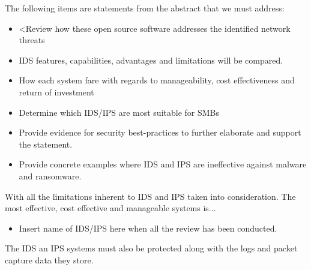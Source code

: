 \begin{followup}
    The following items are statements from the abstract that we must address:
    
    \begin{itemize}
        \item <Review how these open source software addresses the identified network threats
        \item IDS features, capabilities, advantages and limitations will be compared.
        \item How each system fare with regards to manageability, cost effectiveness and return of investment
        \item Determine which IDS/IPS are most suitable for SMBs
    \end{itemize}
    
\end{followup}


\begin{followup}[to-do]
    \begin{itemize}
        \item Provide evidence for security best-practices to further elaborate and support the statement.
        \item Provide concrete examples where IDS and IPS are ineffective against malware and ransomware.
    \end{itemize}
\end{followup}

With all the limitations inherent to IDS and IPS taken into consideration. The most effective, cost effective and manageable systems is...

\begin{followup}[to-do]
    \begin{itemize}
        \item Insert name of IDS/IPS here when all the review has been conducted.
    \end{itemize}
\end{followup}


The IDS an IPS systems must also be protected along with the logs and packet capture data they store.